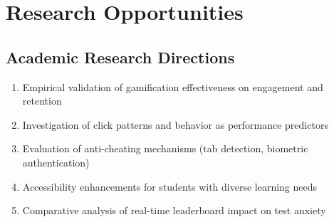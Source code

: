 \documentclass[12pt,a4paper]{report}
\begin{document}
\section{Research Opportunities}

\subsection{Academic Research Directions}

\begin{enumerate}[left=0pt]
  \item Empirical validation of gamification effectiveness on engagement and retention
  \item Investigation of click patterns and behavior as performance predictors
  \item Evaluation of anti-cheating mechanisms (tab detection, biometric authentication)
  \item Accessibility enhancements for students with diverse learning needs
  \item Comparative analysis of real-time leaderboard impact on test anxiety
\end{enumerate}

\cleardoublepage

\end{document}

